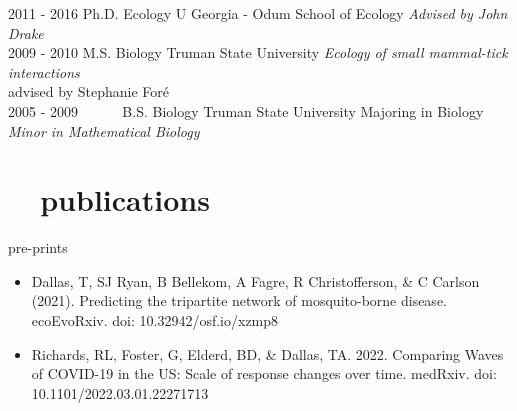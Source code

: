 \documentclass[]{CV}
\begin{document}
\begin{entrylist}
  \entry
    {2011 - 2016}
    {\normalfont Ph.D. Ecology}
    {U Georgia - Odum School of Ecology}
    {\emph{Advised by John Drake}}\\

  \entry
    {2009 - 2010}
    {M.S. Biology}
    {Truman State University}
    {\emph{Ecology of small mammal-tick interactions} \\ advised by Stephanie For\'e}\\

 \entry
    {2005 - 2009 \ \ \ \ \ }
    {B.S. Biology}
    {Truman State University}
    {Majoring in Biology\\
    \emph{Minor in Mathematical Biology}}\\
\end{entrylist}














\section{\faBook \ \  publications}


{\yearfont pre-prints} 

\begin{itemize}

\item {\mefont Dallas, T}, SJ Ryan, B Bellekom, A Fagre,  R Christofferson, \& C Carlson (2021). Predicting the tripartite network of mosquito-borne disease. ecoEvoRxiv. doi: 10.32942/osf.io/xzmp8

\item Richards, RL, Foster, G, Elderd, BD, \& Dallas, TA. 2022. Comparing Waves of COVID-19 in the US: Scale of response changes over time. medRxiv. doi: 10.1101/2022.03.01.22271713 

\end{itemize}




{}
\end{document}
